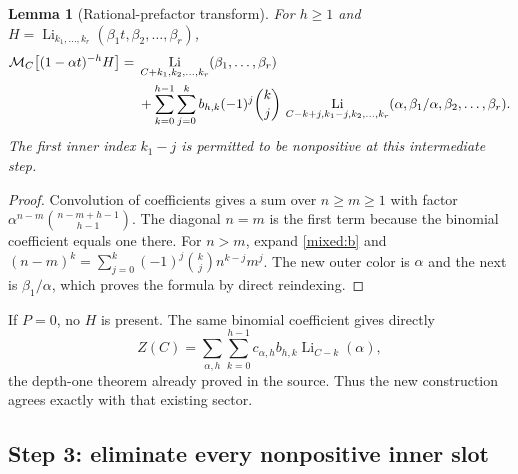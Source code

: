\documentclass[11pt]{article}
\numberwithin{equation}{section}
\theoremstyle{plain}
\newtheorem{lemma}[theorem]{Lemma}
\theoremstyle{definition}
\theoremstyle{remark}
\DeclareMathOperator{\Li}{Li}
\newcommand{\Mcal}{\mathcal M}
\begin{document}
\begin{lemma}[Rational-prefactor transform]\label{mixed:prefactor}
For $h\ge1$ and $H=\Li_{k_1,\ldots,k_r}
(\beta_1t,\beta_2,\ldots,\beta_r)$,
\begin{align}\label{mixed:prefactorformula}
 \Mcal_C\bigl[(1-\alpha t)^{-h}H\bigr]
 ={}&\Li_{C+k_1,k_2,\ldots,k_r}(\beta_1,\ldots,\beta_r)\notag\\
 &+\sum_{k=0}^{h-1}\sum_{j=0}^k
 b_{h,k}(-1)^j\binom kj\,
 \Li_{C-k+j,k_1-j,k_2,\ldots,k_r}
       (\alpha,\beta_1/\alpha,\beta_2,\ldots,\beta_r).
\end{align}
The first inner index $k_1-j$ is permitted to be nonpositive at this
intermediate step.
\end{lemma}
\begin{proof}
Convolution of coefficients gives a sum over $n\ge m\ge1$ with
factor $\alpha^{n-m}\binom{n-m+h-1}{h-1}$. The diagonal $n=m$
is the first term because the binomial coefficient equals one there.
For $n>m$, expand \eqref{mixed:b} and
$(n-m)^k=\sum_{j=0}^k(-1)^j\binom kj n^{k-j}m^j$.
The new outer color is $\alpha$ and the next is $\beta_1/\alpha$,
which proves the formula by direct reindexing.
\end{proof}

If $P=0$, no $H$ is present. The same binomial coefficient gives
directly
\begin{equation}\label{mixed:rationalonly}
 Z(C)=\sum_{\alpha,h}\sum_{k=0}^{h-1}
                    c_{\alpha,h}b_{h,k}\Li_{C-k}(\alpha),
\end{equation}
the depth-one theorem already proved in the source. Thus the new
construction agrees exactly with that existing sector.

\subsection{Step 3: eliminate every nonpositive inner slot}
\end{document}
